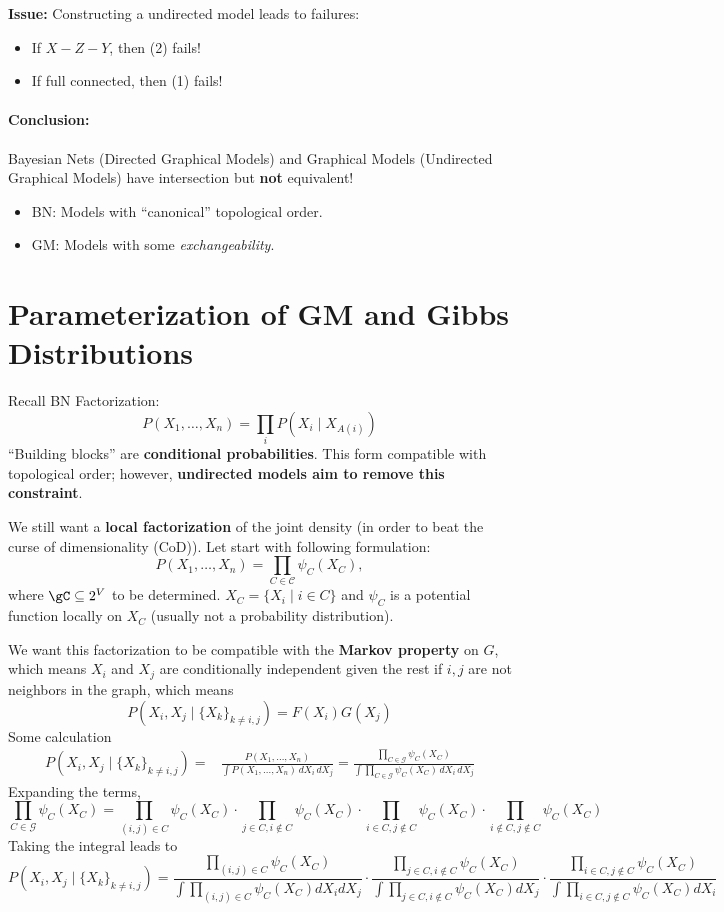 \documentclass{article}%
\begin{document}
\textbf{Issue:} Constructing a undirected model leads to failures:
\begin{itemize}
    \item If \( X - Z - Y \), then (2) fails!
    \item If full connected, then (1) fails!
\end{itemize}

\paragraph{Conclusion:} Bayesian Nets (Directed Graphical Models) and Graphical Models (Undirected Graphical Models) have intersection but \textbf{not} equivalent!
\begin{itemize}
    \item BN: Models with ``canonical'' topological order.
    \item GM: Models with some \textit{exchangeability}.
\end{itemize}

\section{Parameterization of GM and Gibbs Distributions}

Recall BN Factorization:
\[
P(X_1, \dots, X_n) = \prod_i P(X_i \mid X_{A(i)})
\]
``Building blocks'' are \textbf{conditional probabilities}. This form compatible with topological order; however, \textbf{undirected models aim to remove this constraint}.

We still want a \textbf{local factorization} of the joint density (in order to beat the curse of dimensionality (CoD)). Let start with following formulation:
\[
P(X_1, \dots, X_n) = \prod_{C \in \mathcal{C}} \psi_C (X_C),
\]
where $\gC \subseteq 2^V$ to be determined. 
\(
X_C = \{X_i \mid i \in C\}
\) and $\psi_C$ is a potential function locally on $X_C$ (usually not a probability distribution).

We want this factorization to be compatible with the \textbf{Markov property} on \( G \), which means \( X_i \) and \( X_j \) are conditionally independent given the rest if \( i, j \) are not neighbors in the graph, which means
\[
    P \left( X_i, X_j \mid \{X_k\}_{k \neq i,j} \right) = F(X_i) G(X_j)
\]
Some calculation
\begin{align*}
P \left( X_i, X_j \mid \{X_k\}_{k \neq i,j} \right) =&\frac{P(X_1, \dots, X_n)}{\int P(X_1, \dots, X_n) \, dX_i \, dX_j}=\frac{\prod_{C \in \mathcal{G}} \psi_C (X_C)}
{\int \prod_{C \in \mathcal{G}} \psi_C (X_C) \, dX_i \, dX_j}
\end{align*}
Expanding the terms,
\[\prod_{C \in \mathcal{G}} \psi_C (X_C)=
\prod_{(i,j) \in C} \psi_C (X_C) \cdot 
\prod_{j \in C, i \notin C} \psi_C (X_C) \cdot 
\prod_{i \in C, j \notin C} \psi_C (X_C) \cdot
\prod_{i \notin C, j \notin C} \psi_C (X_C)
\]
Taking the integral leads to 
\[
P \left( X_i, X_j \mid \{X_k\}_{k \neq i,j} \right)=\frac{\prod_{(i,j) \in C} \psi_C (X_C)}{\int \prod_{(i,j) \in C} \psi_C (X_C) dX_i dX_j}\cdot\frac{\prod_{j \in C, i \notin C} \psi_C (X_C)}{\int \prod_{j \in C, i \notin C} \psi_C (X_C)dX_j} \cdot\frac{\prod_{i \in C, j \notin C} \psi_C (X_C)}{\int\prod_{i \in C, j \notin C} \psi_C (X_C) dX_i} 
\]
\end{document}
